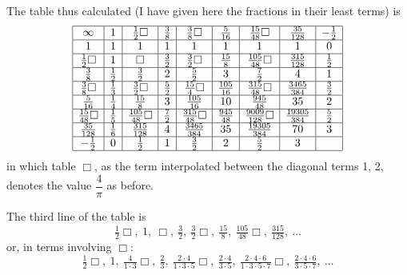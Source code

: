 \documentclass[11pt,a4paper]{article}
\begin{document}
The table thus calculated (I have given here the fractions in their least terms) is
\[
\begin{array}{|c|c|c|c|c|c|c|c|c|}
\hline
\infty & 1 & \tfrac{1}{2}\Box & \tfrac{3}{8} & \tfrac{3}{8}\Box & \tfrac{5}{16} & \tfrac{15}{48}\Box & \tfrac{35}{128} & -\tfrac{1}{2}\\
\hline
1 & 1 & 1 & 1 & 1 & 1 & 1 & 1 & 0 \\
\hline
\tfrac{1}{2}\Box & 1 & \Box & \tfrac{3}{2} & \tfrac{3}{2}\Box & \tfrac{15}{8} & \tfrac{105}{48}\Box & \tfrac{315}{128} & \tfrac{1}{2}\\
\hline
\tfrac{3}{8} & \tfrac{1}{2} & \tfrac{3}{2} & 2 & \tfrac{5}{2} & 3 & \tfrac{7}{2} & 4 & 1 \\
\hline
\tfrac{3}{8}\Box & \tfrac{1}{3} & \tfrac{3}{2}\Box & \tfrac{5}{2} & \tfrac{15}{4}\Box & \tfrac{105}{16} & \tfrac{315}{48}\Box & \tfrac{3465}{384} & \tfrac{3}{2}\\
\hline
\tfrac{5}{16} & \tfrac{1}{4} & \tfrac{15}{8} & 3 & \tfrac{105}{16} & 10 & \tfrac{945}{48} & 35 & 2 \\
\hline
\tfrac{15}{48}\Box & \tfrac{1}{5} & \tfrac{105}{48}\Box & \tfrac{7}{2} & \tfrac{315}{48}\Box & \tfrac{945}{48} & \tfrac{9009}{128}\Box & \tfrac{19305}{384} & \tfrac{5}{2}\\
\hline
\tfrac{35}{128} & \tfrac{1}{6} & \tfrac{315}{128} & 4 & \tfrac{3465}{384} & 35 & \tfrac{19305}{384} & 70 & 3 \\
\hline
-\tfrac{1}{2} & 0 & \tfrac{1}{2} & 1 & \tfrac{3}{2} & 2 & \tfrac{5}{2} & 3 & \\
\hline
\end{array}
\]
in which table $\Box$, as the term interpolated between the diagonal terms 1, 2, denotes the value $\dfrac{4}{\pi}$ as before.

The third line of the table is
\[
\tfrac{1}{2}\Box,\ 1,\ \Box,\ \tfrac{3}{2},\ \tfrac{3}{2}\Box,\ \tfrac{15}{8},\ \tfrac{105}{48}\Box,\ \tfrac{315}{128},\ \ldots
\]
or, in terms involving $\Box$:
\[
\tfrac{1}{2}\Box,\ 1,\ \tfrac{4}{1 \cdot 3}\Box,\ \tfrac{2}{3},\ \tfrac{2 \cdot 4}{1 \cdot 3 \cdot 5}\Box,\ \tfrac{2 \cdot 4}{3 \cdot 5},\ \tfrac{2 \cdot 4 \cdot 6}{1 \cdot 3 \cdot 5 \cdot 7}\Box,\ \tfrac{2 \cdot 4 \cdot 6}{3 \cdot 5 \cdot 7},\ \ldots
\]
\end{document}
